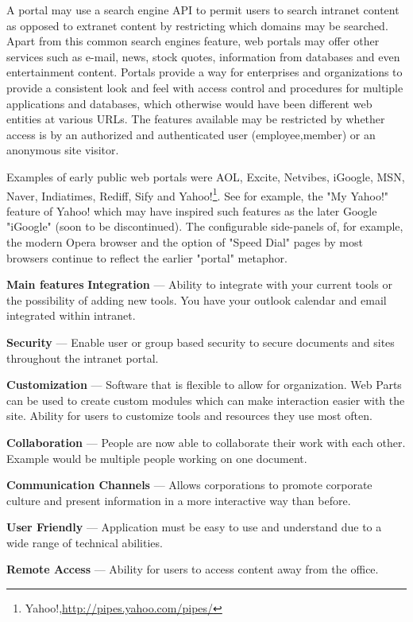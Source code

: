 		A portal may use a search engine API to permit users to search intranet content as opposed to extranet content by restricting which domains may be searched. Apart from this common search engines feature, web portals may offer other services such as e-mail, news, stock quotes, information from databases and even entertainment content. Portals provide a way for enterprises and organizations to provide a consistent look and feel with access control and procedures for multiple applications and databases, which otherwise would have been different web entities at various URLs. The features available may be restricted by whether access is by an authorized and authenticated user (employee,member) or an anonymous site visitor.

		Examples of early public web portals were AOL, Excite, Netvibes, iGoogle, MSN, Naver, Indiatimes, Rediff, Sify and Yahoo!\footnote{Yahoo!,\url{http://pipes.yahoo.com/pipes/}}. See for example, the "My Yahoo!" feature of Yahoo! which may have inspired such features as the later Google "iGoogle" (soon to be discontinued). The configurable side-panels of, for example, the modern Opera browser and the option of "Speed Dial" pages by most browsers continue to reflect the earlier "portal" metaphor.

		\textbf{Main features}
		\textbf{Integration} — Ability to integrate with your current tools or the possibility of adding new tools. You have your outlook calendar and email integrated within intranet.

        \textbf{Security} — Enable user or group based security to secure documents and sites throughout the intranet portal.

		\textbf{Customization} — Software that is flexible to allow for organization. Web Parts can be used to create custom modules which can make interaction easier with the site. Ability for users to customize tools and resources they use most often.

		\textbf{Collaboration} — People are now able to collaborate their work with each other. Example would be multiple people working on one document.

		\textbf{Communication Channels} — Allows corporations to promote corporate culture and present information in a more interactive way than before.

		\textbf{User Friendly} — Application must be easy to use and understand due to a wide range of technical abilities.

		\textbf{Remote Access} — Ability for users to access content away from the office.

